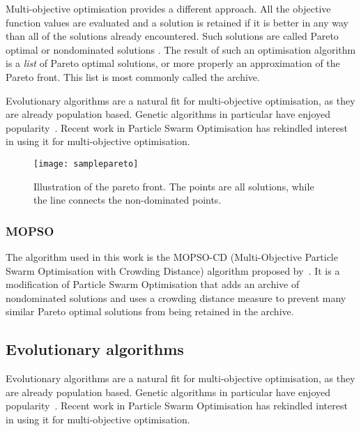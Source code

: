 Multi-objective optimisation provides a different approach.
All the objective function values are evaluated and a solution is retained if it is better in any way than all of the solutions already encountered.
Such solutions are called Pareto optimal or nondominated solutions \citep{steuer1986multiple}.
The result of such an optimisation algorithm is a \emph{list} of Pareto optimal solutions, or more properly an approximation of the Pareto front.
This list is most commonly called the archive.

Evolutionary algorithms are a natural fit for multi-objective optimisation, as they are already population based.
Genetic algorithms in particular have enjoyed popularity~\citep{deb.kalyanmoy2001multi-objective}.
Recent work in Particle Swarm Optimisation has rekindled interest in using it for multi-objective optimisation.

\begin{figure}[htbp]
  \centering
  \texttt{[image: samplepareto]}
  \caption{Illustration of the pareto front.  The points are all solutions, while the line connects the non-dominated points.}
  \label{fig:paretofrontexample}
\end{figure}

\subsubsection{MOPSO}\label{sec:mopso}
The algorithm used in this work is the MOPSO-CD (Multi-Objective Particle Swarm Optimisation with Crowding Distance) algorithm proposed by~\citet{raquel.naval2005effective}.
It is a modification of Particle Swarm Optimisation that adds an archive of nondominated solutions and uses a crowding distance measure to prevent many similar Pareto optimal solutions from being retained in the archive.


\subsection{Evolutionary algorithms}
Evolutionary algorithms are a natural fit for multi-objective optimisation, as they are already population based.
Genetic algorithms in particular have enjoyed popularity~\citep{deb.kalyanmoy2001multi-objective}.
Recent work in Particle Swarm Optimisation has rekindled interest in using it for multi-objective optimisation.


